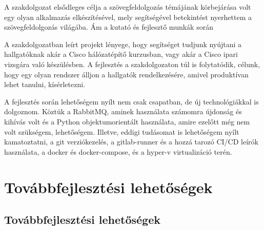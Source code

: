 \documentclass[12pt]{report}
\begin{document}
A szakdolgozat elsődleges célja a szövegfeldolgozás témájának körbejárása volt egy olyan alkalmazás elkészítésével, mely segítségével betekintést nyerhettem a szövegfeldolgozás világába. Ám a kutató és fejlesztő munkák során 

A szakdolgozatban leírt projekt lényege, hogy segítséget tudjunk nyújtani a hallgatóknak akár a Cisco hálózatépítő kurzusban, vagy akár a Cisco ipari vizsgára való készülésben. A fejlesztés a szakdolgozaton túl is folytatódik, célunk, hogy egy olyan rendszer álljon a hallgatók rendelkezésére, amivel produktívan lehet tanulni, kísérletezni.

A fejlesztés során lehetőségem nyílt nem csak csapatban, de új technológiákkal is dolgoznom. Köztük a RabbitMQ, aminek használata számomra újdonság és kihívás volt és a Python objektumorientált használata, amire ezelőtt még nem volt szükségem, lehetőségem. Illetve, eddigi tudásomat is lehetőségem nyílt kamatoztatni, a git verziókezelés, a gitlab-runner és a hozzá tarozó CI/CD leírók használata, a docker és docker-compose, és a hyper-v virtualizáció terén.


\chapter{Továbbfejlesztési lehetőségek}
\section{Továbbfejlesztési lehetőségek}
\end{document}
